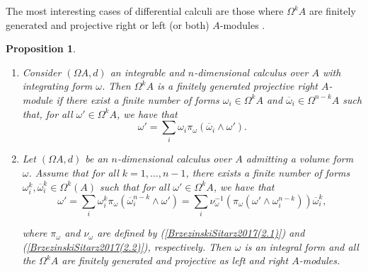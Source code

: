 \documentclass{amsart}
\newtheorem{proposition}[theorem]{Proposition}
\theoremstyle{definition}
\theoremstyle{remark}
\numberwithin{equation}{section}
\begin{document}



The most interesting cases of differential calculi are those where $\Omega^k A$ are finitely generated and projective right or left (or both) $A$-modules \cite{Brzezinski2011}.

\begin{proposition}\label{BrzezinskiSitarz2017Lemmas2.6and2.7}
\begin{enumerate}
\item [\rm (1)] \cite[Lemma 2.6]{BrzezinskiSitarz2017} Consider $(\Omega A, d)$ an integrable and $n$-dimensional calculus over $A$ with integrating form $\omega$. Then $\Omega^{k} A$ is a finitely generated projective right $A$-module if there exist a finite number of forms $\omega_i \in \Omega^{k} A$ and $\overline{\omega}_i \in \Omega^{n-k} A$ such that, for all $\omega' \in \Omega^{k} A$, we have that 
\begin{equation*}
\omega' = \sum_{i} \omega_i \pi_{\omega} (\overline{\omega}_i \wedge \omega').
\end{equation*}

\item [\rm (2)] \cite[Lemma 2.7]{BrzezinskiSitarz2017} Let $(\Omega A, d)$ be an $n$-dimensional calculus over $A$ admitting a volume form $\omega$. Assume that for all $k = 1, \ldots, n-1$, there exists a finite number of forms $\omega_{i}^{k},\overline{\omega}_{i}^{k} \in \Omega^{k}(A)$ such that for all $\omega'\in \Omega^kA$, we have that
\begin{equation*}
\omega'=\displaystyle\sum_i\omega_{i}^{k}\pi_\omega(\overline{\omega}_{i}^{n-k}\wedge\omega')=\displaystyle\sum_i\nu_{\omega}^{-1}(\pi_\omega(\omega'\wedge\omega_{i}^{n-k}))\overline{\omega}_{i}^{k},
\end{equation*}

where $\pi_{\omega}$ and $\nu_{\omega}$ are defined by {\rm (}\ref{BrzezinskiSitarz2017(2.1)}{\rm )} and {\rm (}\ref{BrzezinskiSitarz2017(2.2)}{\rm )}, respectively. Then $\omega$ is an integral form and all the $\Omega^{k}A$ are finitely generated and projective as left and right $A$-modules.
\end{enumerate}
\end{proposition}
\end{document}
